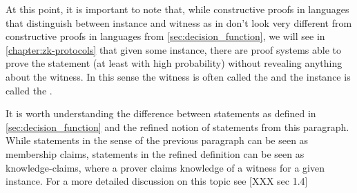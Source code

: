 At this point, it is important to note that, while constructive proofs in languages that distinguish between instance and witness as in \label{def:refined_language} don't look very different from constructive proofs in languages from \ref{sec:decision_function}, we will see in \ref{chapter:zk-protocols} that given some instance, there are proof systems able to prove the statement (at least with high probability) without revealing anything about the witness. In this sense the witness is often called the  and the instance is called the .

It is worth understanding the difference between statements as defined in \ref{sec:decision_function} and the refined notion of statements from this paragraph. While statements in the sense of the previous paragraph can be seen as membership claims, statements in the refined definition can be seen as knowledge-claims, where a prover claims knowledge of a witness for a given instance. For a more detailed discussion on this topic see [XXX sec 1.4]
